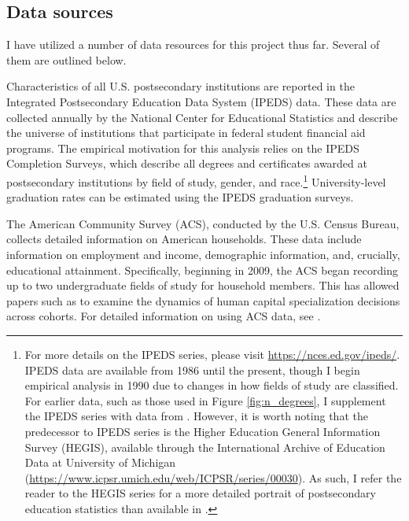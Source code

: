 \subsection{Data sources}\label{sec:data_sources}

I have utilized a number of data resources for this project thus far. Several of them are outlined below. 

Characteristics of all U.S. postsecondary institutions are reported in the Integrated Postsecondary Education Data System (IPEDS) data.
These data are collected annually by the National Center for Educational Statistics and describe the universe of institutions that participate in federal student financial aid programs. 
The empirical motivation for this analysis relies on the IPEDS Completion Surveys, which describe all degrees and certificates awarded at postsecondary institutions by field of study, gender, and race.\footnote{
    For more details on the IPEDS series, please visit \url{https://nces.ed.gov/ipeds/}.
    IPEDS data are available from 1986 until the present, though I begin empirical analysis in 1990 due to changes in how fields of study are classified.
    For earlier data, such as those used in Figure \ref{fig:n_degrees}, I supplement the IPEDS series with data from \textcite{S93}.
    However, it is worth noting that the predecessor to IPEDS series is the Higher Education General Information Survey (HEGIS), available through the International Archive of Education Data at University of Michigan (\url{https://www.icpsr.umich.edu/web/ICPSR/series/00030}). As such, I refer the reader to the HEGIS series for a more detailed portrait of postsecondary education statistics than available in \textcite{S93}.
}
University-level graduation rates can be estimated using the IPEDS graduation surveys.

The American Community Survey (ACS), conducted by the U.S. Census Bureau, collects detailed information on American households. 
These data include information on employment and income, demographic information, and, crucially, educational attainment. 
Specifically, beginning in 2009, the ACS began recording up to two undergraduate fields of study for household members.
This has allowed papers such as \textcite{SHB19} to examine the dynamics of human capital specialization decisions across cohorts. 
For detailed information on using ACS data, see \textcite{IPUMS}.

